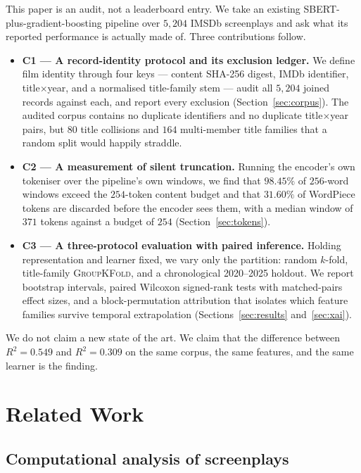\documentclass[conference,a4paper]{IEEEtran}
\newcommand{\hlt}[1]{\textbf{#1}}
\begin{document}
This paper is an audit, not a leaderboard entry. We take an existing
SBERT-plus-gradient-boosting pipeline over $5{,}204$ IMSDb screenplays and
ask what its reported performance is actually made of. Three
contributions follow.

\begin{itemize}
\item \hlt{C1 --- A record-identity protocol and its exclusion ledger.}
  We define film identity through four keys --- content SHA-256 digest,
  IMDb identifier, title$\times$year, and a normalised title-family stem
  --- audit all $5{,}204$ joined records against each, and report every
  exclusion (Section~\ref{sec:corpus}). The audited corpus contains no
  duplicate identifiers and no duplicate title$\times$year pairs, but
  $80$ title collisions and $164$ multi-member title families that a
  random split would happily straddle.
\item \hlt{C2 --- A measurement of silent truncation.} Running the
  encoder's own tokeniser over the pipeline's own windows, we find that
  $98.45\%$ of $256$-word windows exceed the $254$-token content budget
  and that $31.60\%$ of WordPiece tokens are discarded before the encoder
  sees them, with a median window of $371$ tokens against a budget of
  $254$ (Section~\ref{sec:tokens}).
\item \hlt{C3 --- A three-protocol evaluation with paired inference.}
  Holding representation and learner fixed, we vary only the partition:
  random $k$-fold, title-family \textsc{GroupKFold}, and a chronological
  2020--2025 holdout. We report bootstrap intervals, paired Wilcoxon
  signed-rank tests with matched-pairs effect sizes, and a
  block-permutation attribution that isolates which feature families
  survive temporal extrapolation (Sections~\ref{sec:results}
  and~\ref{sec:xai}).
\end{itemize}

We do not claim a new state of the art. We claim that the difference
between $R^{2}=0.549$ and $R^{2}=0.309$ on the same corpus, the same
features, and the same learner is the finding.

\section{Related Work}

\subsection{Computational analysis of screenplays}
\end{document}
